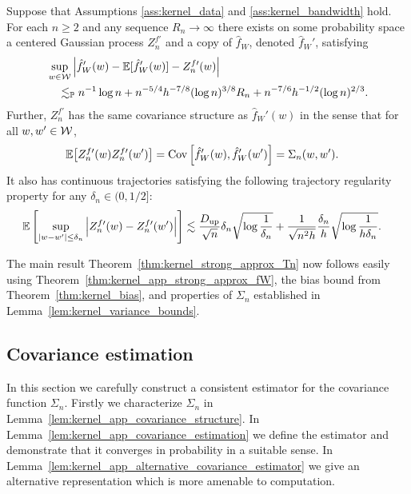 \begin{theorem}
  \label{thm:kernel_app_strong_approx_fW}

  Suppose that Assumptions
  \ref{ass:kernel_data} and \ref{ass:kernel_bandwidth} hold.
  For each $n \geq 2$
  and any sequence $R_n \to \infty$
  there exists on some probability space
  a centered Gaussian process $Z_n^{f\prime}$
  and a copy of $\hat f_W$,
  denoted $\hat f_W'$,
  satisfying
  \begin{align*}
    &\sup_{w \in \mathcal{W}}
    \Big|
    \hat f_W'(w) - \mathbb{E}[\hat f_W'(w)]
    - Z_n^{f\prime}(w)
    \Big| \\
    &\quad\lesssim_{\mathbb{P}}
    n^{-1} \log n
    + n^{-5/4} h^{-7/8} (\log n)^{3/8} R_n
    + n^{-7/6} h^{-1/2} (\log n)^{2/3}.
  \end{align*}
  Further, $Z_n^{f\prime}$ has the same covariance
  structure as
  $\hat f_W'(w)$
  in the sense that for all
  $w, w' \in \mathcal{W}$,
  \begin{align*}
    \mathbb{E}\big[Z_n^{f\prime}(w) Z_n^{f\prime}(w')\big]
    &=
    \operatorname{Cov}\Big[
      \hat f_W'(w),
      \hat f_W'(w')
    \Big]
    = \Sigma_n(w,w').
  \end{align*}
  It also has continuous trajectories satisfying
  the following trajectory regularity property
  for any $\delta_n \in (0, 1/2]$:
  \begin{align*}
    \mathbb{E}\left[
      \sup_{|w-w'| \leq \delta_n}
      \Big|
      Z_n^{f\prime}(w)
      - Z_n^{f\prime}(w')
      \Big|
    \right]
    &\lesssim
    \frac{D_{\textup{up}}}{\sqrt n} \delta_n
    \sqrt{\log \frac{1}{\delta_n}}
    + \frac{1}{\sqrt{n^2h}}
    \frac{\delta_n}{h}
    \sqrt{\log \frac{1}{h\delta_n}}.
  \end{align*}
\end{theorem}

The main result Theorem~\ref{thm:kernel_strong_approx_Tn}
now follows easily using Theorem~\ref{thm:kernel_app_strong_approx_fW},
the bias bound from Theorem~\ref{thm:kernel_bias},
and properties of $\Sigma_n$ established in
Lemma~\ref{lem:kernel_variance_bounds}.

\subsection{Covariance estimation}
\label{sec:kernel_app_covariance_estimation}

In this section we carefully construct a consistent estimator for the
covariance function $\Sigma_n$. Firstly we characterize $\Sigma_n$ in
Lemma~\ref{lem:kernel_app_covariance_structure}. In
Lemma~\ref{lem:kernel_app_covariance_estimation}
we define the estimator and demonstrate that it converges in probability in a
suitable sense. In Lemma~\ref{lem:kernel_app_alternative_covariance_estimator}
we give an
alternative representation which is more amenable to computation.

